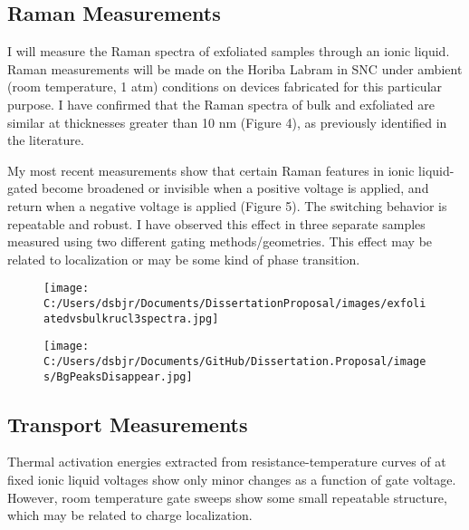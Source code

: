 \documentclass[11pt]{article}
\begin{document}
\subsection{Raman Measurements}

I will measure the Raman spectra of exfoliated \rucl samples through an ionic liquid. Raman measurements will be made on the Horiba Labram in SNC under ambient (room temperature, 1 atm) conditions on devices fabricated for this particular purpose. I have confirmed that the Raman spectra of bulk and exfoliated \rucl are similar at thicknesses greater than 10 nm (Figure 4), as previously identified in the literature.

My most recent measurements show that certain Raman features in ionic liquid-gated \rucl become broadened or invisible when a positive voltage is applied, and return when a negative voltage is applied (Figure 5). The switching behavior is repeatable and robust. I have observed this effect in three separate samples measured using two different gating methods/geometries. This effect may be related to localization or may be some kind of phase transition.

\begin{figure}
\centering
\begin{minipage}{0.5\textwidth}
\centering
	{\texttt{[image: C:/Users/dsbjr/Documents/DissertationProposal/images/exfoliatedvsbulkrucl3spectra.jpg]}\label{fig:f4}}
  \captionsetup{width=0.9\textwidth}
\end{minipage}%
\begin{minipage}{0.5\textwidth}
\centering 
  {\texttt{[image: C:/Users/dsbjr/Documents/GitHub/Dissertation.Proposal/images/BgPeaksDisappear.jpg]}\label{fig:f5}}
  \captionsetup{width=0.9\textwidth}
\end{minipage}
\end{figure}

\subsection{Transport Measurements}

Thermal activation energies extracted from resistance-temperature curves of \rucl at fixed ionic liquid voltages show only minor changes as a function of gate voltage. However, room temperature gate sweeps show some small repeatable structure, which may be related to charge localization.
\end{document}
